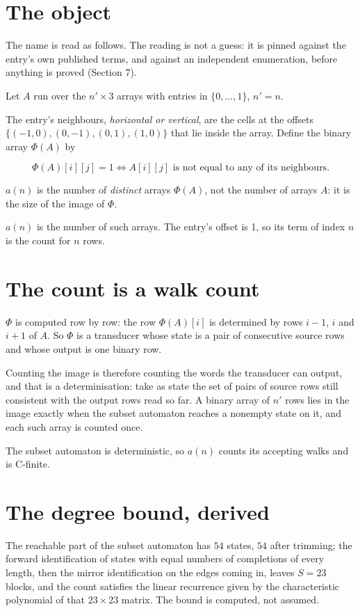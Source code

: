 \documentclass[11pt]{article}
\theoremstyle{definition}
\begin{document}
\section{The object}

The name is read as follows. The reading is not a guess: it is pinned against the entry's own published terms, and against an independent enumeration, before anything is proved (Section 7).

Let $A$ run over the $n' \times 3$ arrays with entries in $\{0,\dots,1\}$, $n' = n$.

The entry's neighbours, {\itshape horizontal or vertical}, are the cells at the offsets $\{(-1,0), (0,-1), (0,1), (1,0)\}$ that lie inside the array. Define the binary array $\Phi(A)$ by

\[\Phi(A)[i][j] = 1 \iff A[i][j] \text{ is not equal to any of its neighbours}.\]

$a(n)$ is the number of {\itshape distinct} arrays $\Phi(A)$, not the number of arrays $A$: it is the size of the image of $\Phi$.

$a(n)$ is the number of such arrays. The entry's offset is 1, so its term of index $n$ is the count for $n$ rows.

\section{The count is a walk count}

$\Phi$ is computed row by row: the row $\Phi(A)[i]$ is determined by rows $i-1$, $i$ and $i+1$ of $A$. So $\Phi$ is a transducer whose state is a pair of consecutive source rows and whose output is one binary row.

Counting the image is therefore counting the words the transducer can output, and that is a determinisation: take as state the set of pairs of source rows still consistent with the output rows read so far. A binary array of $n'$ rows lies in the image exactly when the subset automaton reaches a nonempty state on it, and each such array is counted once.

The subset automaton is deterministic, so $a(n)$ counts its accepting walks and is C-finite.

\section{The degree bound, derived}

The reachable part of the subset automaton has $54$ states, $54$ after trimming; the forward identification of states with equal numbers of completions of every length, then the mirror identification on the edges coming in, leaves $S = 23$ blocks, and the count satisfies the linear recurrence given by the characteristic polynomial of that $23\times23$ matrix. The bound is computed, not assumed.
\end{document}
